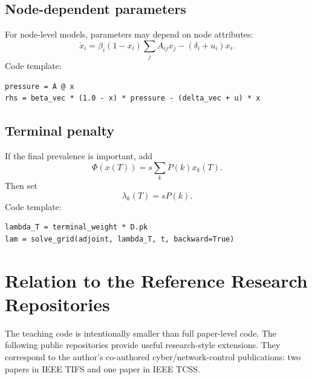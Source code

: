 \documentclass[11pt,a4paper]{article}
\begin{document}
\subsection{Node-dependent parameters}

For node-level models, parameters may depend on node attributes:
\[
  \dot{x}_i=\beta_i(1-x_i)\sum_jA_{ij}x_j-(\delta_i+u_i)x_i.
\]
Code template:

\begin{lstlisting}[style=py]
pressure = A @ x
rhs = beta_vec * (1.0 - x) * pressure - (delta_vec + u) * x
\end{lstlisting}

\subsection{Terminal penalty}

If the final prevalence is important, add
\[
  \Phi(x(T))=s\sum_kP(k)x_k(T).
\]
Then set
\[
  \lambda_k(T)=sP(k).
\]
Code template:

\begin{lstlisting}[style=py]
lambda_T = terminal_weight * D.pk
lam = solve_grid(adjoint, lambda_T, t, backward=True)
\end{lstlisting}

\section{Relation to the Reference Research Repositories}

The teaching code is intentionally smaller than full paper-level code. The following public repositories provide useful research-style extensions. They correspond to the author's co-authored cyber/network-control publications: two papers in IEEE TIFS and one paper in IEEE TCSS.
\end{document}
